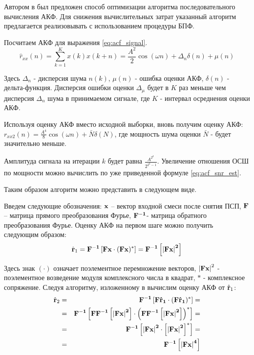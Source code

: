 Автором в \cite{my_acf} был предложен способ оптимизации алгоритма последовательного вычисления АКФ.
Для снижения вычислительных затрат указанный алгоритм предлагается реализовывать с использованием процедуры БПФ. 

Посчитаем АКФ для выражения \ref{eq:acf_signal}.
\begin{equation}
	\label{eq:lpc_akf_n}
	\hat{r}_{xx}(n) = \sum \limits_{k=1}^{K} x(k)x(k+n) = \frac{A^2}{2} \cos{(\omega{n})} + \Delta_n \delta{(n)} + \mu{(n)}
\end{equation}

Здесь ${\Delta_n}$ - дисперсия шума ${n(k)}$, ${\mu{(n)}}$ - ошибка оценки АКФ, ${\delta{(n)}}$ - дельта-функция. Дисперсия ошибки
оценки ${\Delta_{\mu}}$ будет в ${K}$ раз меньше чем дисперсия ${\Delta_n}$ шума в принимаемом сигнале, где ${K}$ - интервал
осреднения оценки АКФ.

Используя оценку АКФ вместо исходной выборки, вновь получим оценку АКФ:
${r_{xx2}(n) = \frac{A^4}{8} \cos{(\omega n)} + \bar{N} \delta{(N)}}$,
где мощность шума оценки ${\bar{N}}$ - будет значительно меньше.

Амплитуда сигнала на итерации ${k}$ будет равна ${\frac{A^{2^k}}{2^{2^k-1}}}$. Увеличение отношения ОСШ по мощности можно
вычислить по уже приведенной формуле \ref{eq:acf_snr_est}. 

Таким образом алгоритм можно представить в следующем виде.

Введем следующие обозначения: ${\bf{x}}$ – вектор входной смеси после снятия ПСП, ${\bf{F}}$ – матрица прямого преобразования Фурье,
${\bf{F}^{-1}}$- матрица обратного преобразования Фурье.  Оценку АКФ на первом шаге можно получить следующим образом:
\begin{equation}
	\label{eq:akf_1}
	\hat{\bf{r}}_1 = \bf{F}^{-1}\left[ \bf{Fx} \cdot (\bf{Fx})^* \right] = \bf{F}^{-1} \left[ \left| \bf{Fx} \right| ^2 \right]
\end{equation}

Здесь знак ${(\cdot)}$  означает поэлементное перемножение векторов, ${\left| \bf{Fx} \right| ^2}$ - поэлементное возведение модуля комплексного числа в квадрат, ${*}$ -
комплексное сопряжение.  Следуя алгоритму, изложенному в \cite{ostanin_akf} вычислим оценку АКФ от ${\hat{\bf{r}}_1}$:
\begin{eqnarray}
	\label{eq:akf_2}
	\hat{\bf{r}}_2 & = & \bf{F}^{-1}\left[ \bf{F} \hat{\bf{r}}_1 \cdot (\bf{F} \hat{\bf{r}}_1)^* \right] = \nonumber \\
		& = & \bf{F}^{-1}	\left[ 
				\bf{FF}^{-1} \left[
						\left| \bf{Fx} \right| ^2
					\right]
						\cdot \left( \bf{FF}^{-1} \left[ \left| \bf{Fx} \right| ^2 \right]
					\right) ^*
			\right] = \nonumber \\
		& = & \bf{F}^{-1} \left[ \left| \bf{Fx} \right| ^2 \cdot \left[ \left| \bf{Fx} \right| ^2 \right] ^* \right] =  \nonumber \\
		& = & \bf{F}^{-1} \left[ \left| \bf{Fx} \right| ^4 \right]
\end{eqnarray}

